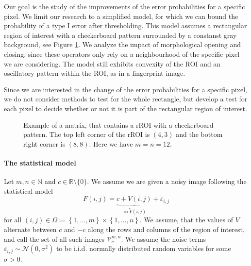 \documentclass[a4paper,12pt]{article}
\theoremstyle{plain}
\theoremstyle{definition}
\begin{document}
Our goal is the study of the improvements of the error probabilities for a specific pixel. We limit our research to a simplified model, for which we can bound the probability of a type I error after thresholding. This model assumes a rectangular region of interest with a checkerboard pattern surrounded by a constanst gray background, see Figure \ref{fig: rROI}. We analyze the impact of morphological opening and closing, since these operators only rely on a neighbourhood of the specific pixel we are considering. The model still exhibits convexity of the ROI and an oscillatory pattern within the ROI, as in a fingerprint image.

Since we are interested in the change of the error probabilities for a specific pixel, we do not consider methods to test for the whole rectangle, but develop a test for each pixel to decide whether or not it is part of the rectangular region of interest.

\begin{figure}[h]
	\centering
	\caption{Example of a matrix, that contains a rROI with a checkerboard pattern. The top left corner of the rROI is $(4, 3)$ and the bottom right corner is $(8, 8)$. Here we have $m = n = 12$.}
	\label{fig: rROI}
\end{figure}

\paragraph{The statistical model}

Let $m, n \in \mathbb{N}$ and $c \in \mathbb{R} \setminus \{ 0 \}$. We assume we are given a noisy image following the statistical model
\begin{equation}\label{statmodel}
	F(i, j) = \underbrace{c + V(i, j)}_{\eqqcolon \tilde{V}(i, j)} + \varepsilon_{i, j}
\end{equation}
for all $(i, j) \in \Omega \coloneqq \left\{ 1, \dots, m \right\} \times \left\{ 1, \dots, n \right\}$. We assume, that the values of $V$ alternate between $c$ and $-c$ along the rows and columns of the region of interest, and call the set of all such images $\mathcal{V}_c^{m, n}$. We assume the noise terms $\varepsilon_{i, j} \sim \mathcal{N}(0, \sigma^2)$ to be i.i.d. normally distributed random variables for some $\sigma > 0$.
\end{document}
